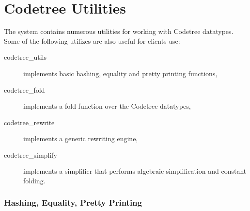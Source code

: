 \section{Codetree Utilities} 

The \LOWCODE{} system contains numerous utilities for working with
Codetree datatypes.  Some of the following utilizes are also useful for clients
use:
\begin{description}
  \item[codetree_utils] implements basic hashing, equality and pretty
printing functions,
  \item[codetree_fold] implements a fold function over the Codetree datatypes,  
  \item[codetree_rewrite] implements a generic rewriting engine,
  \item[codetree_simplify] implements a simplifier that performs algebraic
simplification and constant folding.
\end{description}
\subsubsection{Hashing, Equality, Pretty Printing}

